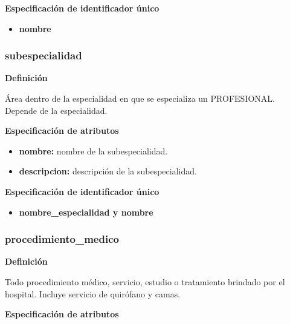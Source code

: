 \documentclass[a4paper,11pt]{article}
\begin{document}
\textbf{Especificación de identificador único}

\begin{itemize}

     \item \textbf{nombre}

\end{itemize}

\subsubsection{\textbf{subespecialidad}}

\textbf{Definición}

Área dentro de la especialidad en que se especializa un PROFESIONAL. Depende de 
la especialidad.

\textbf{Especificación de atributos}

\begin{itemize}

     \item \textbf{nombre:} nombre de la subespecialidad.

     \item \textbf{descripcion:} descripción de la subespecialidad.

\end{itemize}

\textbf{Especificación de identificador único}

\begin{itemize}

      \item \textbf{nombre\_especialidad y nombre}

\end{itemize}

\subsubsection{\textbf{procedimiento\_medico}}

\textbf{Definición}

Todo procedimiento médico, servicio, estudio o tratamiento brindado por el hospital. 
Incluye servicio de quirófano y camas.

\textbf{Especificación de atributos}
\end{document}
